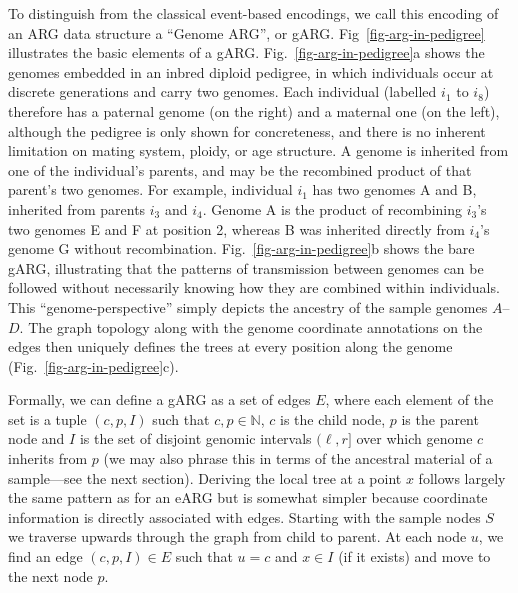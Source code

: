\documentclass{article}
\begin{document}
To distinguish from the classical event-based encodings,
we call this encoding of an ARG data
structure a ``Genome ARG'', or gARG.
Fig~\ref{fig-arg-in-pedigree} illustrates the basic elements of a gARG.
Fig.~\ref{fig-arg-in-pedigree}a shows the genomes
embedded in an inbred diploid pedigree, in which individuals occur at
discrete generations and carry two genomes. Each individual (labelled
$i_1$ to $i_8$) therefore has a paternal genome (on the right) and a maternal one
(on the left), although the pedigree is only shown for concreteness, and
there is no inherent limitation on mating system, ploidy, or age structure.
A genome is inherited from one of the individual's parents,
and may be the recombined product of that parent's two genomes.
For example, individual $i_1$ has two genomes \textsf{A} and \textsf{B},
inherited from parents $i_3$ and $i_4$. Genome \textsf{A} is the product of
recombining $i_3$'s two genomes \textsf{E} and \textsf{F} at position 2,
whereas \textsf{B} was inherited directly from $i_4$'s genome \textsf{G} without
recombination. Fig.~\ref{fig-arg-in-pedigree}b shows the bare gARG, illustrating
that the patterns of
transmission between genomes can be followed without necessarily knowing
how they are combined within individuals. This ``genome-perspective''
simply depicts the ancestry of the sample genomes $A$--$D$. The graph
topology along with the genome coordinate annotations on the
edges then uniquely defines the trees at every position
along the genome (Fig.~\ref{fig-arg-in-pedigree}c).

Formally, we can define a gARG as a set of edges $E$, where each
element of the set is a tuple $(c, p, I)$ such that $c, p \in \mathbb{N}$,
$c$ is the child node, $p$ is the parent node and $I$ is the set of
disjoint genomic intervals $(\ell, r]$ over which genome $c$ inherits from $p$ (we may
also phrase this in terms of the ancestral material of a sample---see
the next section). Deriving the local tree at a point $x$
follows largely the same pattern as for an eARG but is somewhat
simpler because coordinate information is directly associated with
edges. Starting with the sample nodes $S$ we traverse
upwards through the graph from child to parent. At each node $u$, we find an
edge $(c, p, I) \in E$ such that $u = c$ and $x \in I$ (if it
exists) and move to the next node $p$.
\end{document}
